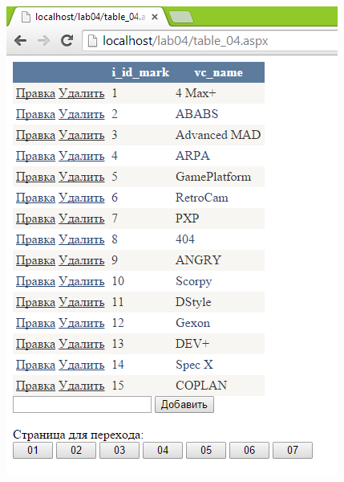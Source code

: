 \documentclass[pscyr]{hedlab}
\begin{document}
\begin{figure}[h!]
        \includegraphics[width=.47\textwidth]{lab04_04}
    \end{figure}
    \pagebreak
\end{document}
